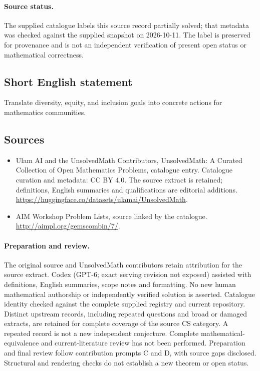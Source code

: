 \documentclass[11pt]{article}
\begin{document}
\paragraph{Source status.}
The supplied catalogue labels this source record partially solved; that metadata was checked against the supplied snapshot on 2026-10-11. The label is preserved for provenance and is not an independent verification of present open status or mathematical correctness.
\subsection{Short English statement}
Translate diversity, equity, and inclusion goals into concrete actions for mathematics communities.
\subsection{Sources}
\begin{itemize}
\item[\hypertarget{source:statement:1}{S1}] Ulam AI and the UnsolvedMath Contributors, UnsolvedMath: A Curated Collection of Open Mathematics Problems, catalogue entry. Catalogue curation and metadata: CC BY 4.0. The source extract is retained; definitions, English summaries and qualifications are editorial additions.
\url{https://huggingface.co/datasets/ulamai/UnsolvedMath}.
\item[\hypertarget{source:statement:2}{S2}] AIM Workshop Problem Lists, source linked by the catalogue.
\url{http://aimpl.org/gemscombin/7/}.
\end{itemize}
\paragraph{Preparation and review.}
The original source and UnsolvedMath contributors retain attribution for the source extract. Codex (GPT-6; exact serving revision not exposed) assisted with definitions, English summaries, scope notes and formatting. No new human mathematical authorship or independently verified solution is asserted. Catalogue identity checked against the complete supplied registry and current repository. Distinct upstream records, including repeated questions and broad or damaged extracts, are retained for complete coverage of the source CS category. A repeated record is not a new independent conjecture. Complete mathematical-equivalence and current-literature review has not been performed. Preparation and final review follow contribution prompts C and D, with source gaps disclosed. Structural and rendering checks do not establish a new theorem or open status.
\label{end:statement}
\end{document}

